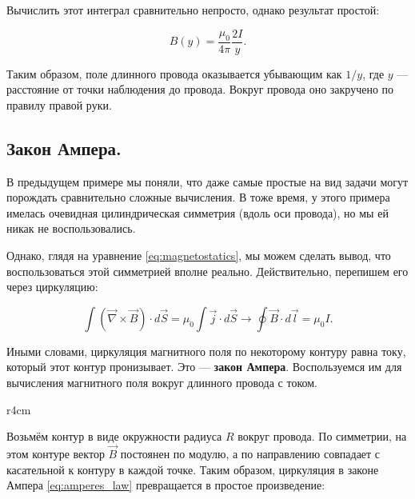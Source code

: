 \documentclass[a4paper,12pt]{article}
\newcommand{\vn}{\vec{\nabla}}
\begin{document}
Вычислить этот интеграл сравнительно непросто, однако результат простой: 

\begin{equation}
  \label{eq:wire_current_3}
  B(y) = \frac{\mu_0}{4\pi} \frac{2I}{y}.
\end{equation}

Таким образом, поле длинного провода оказывается убывающим как $1/y$,
где $y$ --- расстояние от точки наблюдения до провода. Вокруг провода
оно закручено по правилу правой руки. 

\subsection{Закон Ампера.}
\label{sec:amperes_law}

В предыдущем примере мы поняли, что даже самые простые на вид задачи
могут порождать сравнительно сложные вычисления. В тоже время, у этого
примера имелась очевидная цилиндрическая симметрия (вдоль оси
провода), но мы ей никак не воспользовались. 

Однако, глядя на уравнение \eqref{eq:magnetostatics}, мы можем сделать
вывод, что воспользоваться этой симметрией вполне
реально. Действительно, перепишем его через циркуляцию: 

\begin{equation}
  \label{eq:amperes_law}
  \int \left( \vn \times \vec{B} \right) \cdot d \vec{S} =
  \mu_0 \int \vec{j} \cdot d\vec{S} \rightarrow  \oint
  \vec{B} \cdot d\vec{l} = \mu_0 I.
\end{equation}

Иными словами, циркуляция магнитного поля по некоторому контуру равна
току, который этот контур пронизывает. Это --- \textbf{закон
  Ампера}. Воспользуемся им для вычисления магнитного поля вокруг
длинного провода с током. 

\begin{wrapfigure}{r}{4cm}
\centering
{}
\label{fig:current_wire_field}
\end{wrapfigure}

Возьмём контур в виде окружности радиуса $R$ вокруг провода. По
симметрии, на этом контуре вектор $\vec{B}$ постоянен по модулю, а по
направлению совпадает с касательной к контуру в каждой точке. Таким
образом, циркуляция в законе Ампера \eqref{eq:amperes_law}
превращается в простое произведение:
\end{document}
